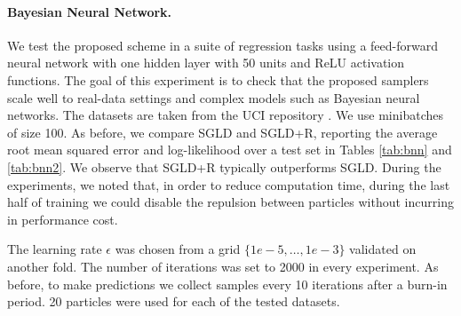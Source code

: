 \paragraph{Bayesian Neural Network.} 
We test the proposed scheme in a suite of regression tasks using a feed-forward neural network with one hidden layer with 50 units and ReLU activation functions. The goal of this experiment is to check that the proposed samplers scale well to real-data settings and complex models such as Bayesian neural networks. The datasets are taken from the UCI repository \parencite{Lichman:2013}. We use minibatches of size 100. %
As before, we compare SGLD and SGLD+R, reporting the average root mean squared error and log-likelihood over a test set in Tables \ref{tab:bnn} and  \ref{tab:bnn2}. We observe that SGLD+R typically outperforms SGLD. During the experiments, we noted that, in order to reduce computation time, during the last half of training we could disable the repulsion between particles without incurring in performance cost.

The learning rate $\epsilon$ was chosen from a grid $\{1e-5, \ldots, 1e-3 \}$ validated on another fold. The number of iterations was set to 2000 in every experiment. As before, to make predictions we collect samples every 10 iterations after a burn-in period. 20 particles were used for each of the tested datasets.

\begin{table}[h]
\caption{Log-Likelihood results for the BNN experiments}\label{tab:bnn}
\end{table}

